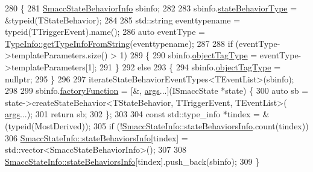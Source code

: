 \begin{DoxyCode}
280   \{
281     \hyperlink{structsmacc_1_1introspection_1_1SmaccStateBehaviorInfo}{SmaccStateBehaviorInfo} sbinfo;
282 
283     sbinfo.\hyperlink{structsmacc_1_1introspection_1_1SmaccStateBehaviorInfo_a85dc84a01fbd0b830ed6598996c4a7c9}{stateBehaviorType} = &\textcolor{keyword}{typeid}(TStateBehavior);
284 
285     std::string eventtypename = \textcolor{keyword}{typeid}(TTriggerEvent).name();
286     \textcolor{keyword}{auto} eventType = \hyperlink{classsmacc_1_1introspection_1_1TypeInfo_a47d65b6c61499d7ae8ab9f6325c84837}{TypeInfo::getTypeInfoFromString}(eventtypename);
287 
288     \textcolor{keywordflow}{if} (eventType->templateParameters.size() > 1)
289     \{
290       sbinfo.\hyperlink{structsmacc_1_1introspection_1_1SmaccStateBehaviorInfo_ae853ad3a28609fd83aa3d395d2e4c163}{objectTagType} = eventType->templateParameters[1];
291     \}
292     \textcolor{keywordflow}{else}
293     \{
294       sbinfo.\hyperlink{structsmacc_1_1introspection_1_1SmaccStateBehaviorInfo_ae853ad3a28609fd83aa3d395d2e4c163}{objectTagType} = \textcolor{keyword}{nullptr};
295     \}
296 
297     iterateStateBehaviorEventTypes<TEventList>(sbinfo);
298 
299     sbinfo.\hyperlink{structsmacc_1_1introspection_1_1SmaccStateBehaviorInfo_a966cf5a5fe5cbe839be792b04e6c7368}{factoryFunction} = [&, \hyperlink{namespacegenerate__debs_a75f9143e38df82d83b2e8a6f99cae02c}{args}...](ISmaccState *state) \{
300       \textcolor{keyword}{auto} sb = state->createStateBehavior<TStateBehavior, TTriggerEvent, TEventList>(
      \hyperlink{namespacegenerate__debs_a75f9143e38df82d83b2e8a6f99cae02c}{args}...);
301       \textcolor{keywordflow}{return} sb;
302     \};
303 
304     \textcolor{keyword}{const} std::type\_info *tindex = &(\textcolor{keyword}{typeid}(MostDerived));
305     \textcolor{keywordflow}{if} (!\hyperlink{classsmacc_1_1introspection_1_1SmaccStateInfo_a7f62357b9ed1db5b8f9fcc3394f7f58b}{SmaccStateInfo::stateBehaviorsInfo}.count(tindex))
306       \hyperlink{classsmacc_1_1introspection_1_1SmaccStateInfo_a7f62357b9ed1db5b8f9fcc3394f7f58b}{SmaccStateInfo::stateBehaviorsInfo}[tindex] = 
      std::vector<SmaccStateBehaviorInfo>();
307 
308     \hyperlink{classsmacc_1_1introspection_1_1SmaccStateInfo_a7f62357b9ed1db5b8f9fcc3394f7f58b}{SmaccStateInfo::stateBehaviorsInfo}[tindex].push\_back(sbinfo);
309   \}
\end{DoxyCode}
